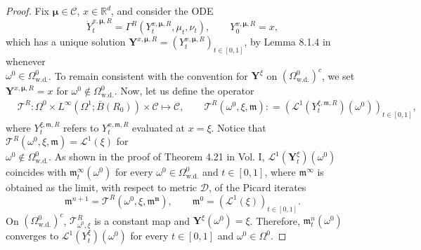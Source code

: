 \documentclass{article}
\newcommand{\R}{\mathbb{R}}
\begin{document}
\begin{appendices}
\begin{proof}
Fix $\bm{\mu}\in \mathcal C$, $x\in\R^d$, and consider the ODE
\begin{equation}\label{eqn:FlowMapY}
    \dot{Y}^{x,\bm{\mu},R}_t = \Gamma^R(Y^{x,\bm{\mu},R}_t,\mu_t,\nu_t), \qquad Y_0^{x,\bm{\mu},R}=x,
\end{equation}
which has a unique solution $\bm{Y}^{x,\bm{\mu},R}=(Y_t^{x,\bm{\mu},R})_{t\in[0,1]}$, by  Lemma 8.1.4 in \cite{Ambrosio2008} whenever \\$\omega^0\in \Omega^0_\mathrm{w.d.}$. To remain consistent with the convention for $\bm{Y}^\xi$ on $(\Omega^0_\mathrm{w.d.})^c$, we set $\bm{Y}^{x,\bm{\mu},R}=x$ for $\omega^0\notin \Omega^0_\mathrm{w.d.}$. Now, let us define the operator
\begin{align*}
&\mathcal T^{R}: \Omega^0\times L^\infty(\Omega^1; \bar B(R_0))\times \mathcal C\mapsto \mathcal C,\qquad\mathcal T^R(\omega^0,\xi,\bm{\mathfrak{m}})\colon= 
   (\mathcal L^1(Y^{\xi,\bm{\mathfrak{m}},R}_t)(\omega^0))_{t\in[0,1]},
\end{align*}
where $Y^{\xi,\bm{\mathfrak{m}},R}_t$ refers to $Y^{x,\bm{\mathfrak{m}},R}_t$ evaluated at $x=\xi$. Notice that $\mathcal T^R(\omega^0,\xi,\bm{\mathfrak{m}})= \mathcal L^1(\xi)$ for \\$\omega^0\notin \Omega^0_\mathrm{w.d.}$.  As shown in the proof of Theorem 4.21 in \cite{carmona2018probabilistic} Vol. I, $\mathcal L^1(\bm{Y}^{\xi}_t)(\omega^0)$ coincides with $\bm{\mathfrak{m}}_t^\infty(\omega^0)$  for every $\omega^0\in \Omega^0_\mathrm{w.d.}$ and $t\in[0,1]$, where $\bm{\mathfrak{m}}^\infty$ is obtained as the limit, with respect to metric $\mathcal D$, of the Picard iterates
\[
\bm{\mathfrak{m}}^{n+1} = \mathcal T^R(\omega^0,\xi, \bm{\mathfrak{m}^n}), \qquad \bm{\mathfrak{m}}^0= (\mathcal L^1(\xi))_{t\in[0,1]}.
\]
 On $(\Omega^{0}_\mathrm{w.d.})^c$, $\mathcal T^R_{\omega^0,\xi}$ is a constant map and $\bm{Y}^{\xi}(\omega^0)=\xi$. Therefore, $\bm{\mathfrak{m}}_t^n(\omega^0)$ converges to $\mathcal L^1(Y^\xi_t)(\omega^0)$ for every $t\in[0,1]$ and $\omega^0\in \Omega^0$.


\end{proof}
\end{appendices}
\end{document}
